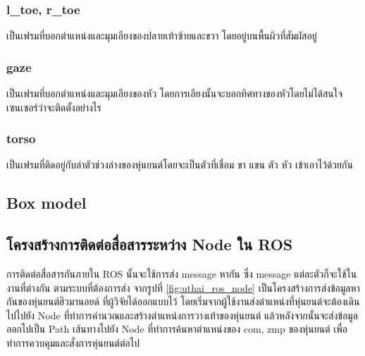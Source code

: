 \subsubsection*{l\_toe, r\_toe}
เป็นเฟรมที่บอกตำแหน่งและมุมเอียงของปลายเท้าซ้ายและขวา โดยอยู่บนพื้นผิวที่สัมผัสอยู่

\subsubsection*{gaze}
เป็นเฟรมที่บอกตำแหน่งและมุมเอียงของหัว โดยการเอียงนั้นจะบอกทิศทางของหัวโดยไม่ได้สนใจเซนเซอร์ว่าจะติดตั้งอย่างไร

\subsubsection*{torso}
เป็นเฟรมที่ติดอยู่กับลำตัวช่วงล่างของหุ่นยนต์โดยจะเป็นตัวที่เชื่อม ขา แขน ตัว หัว เข้าเอาไว้ด้วยกัน


\clearpage
\subsection{Box model}

\clearpage

\clearpage
\subsection{โครงสร้างการติดต่อสื่อสารระหว่าง Node ใน ROS}
การติดต่อสื่อสารกันภายใน ROS นั้นจะใช้การส่ง message หากัน ซึ่ง message แต่ละตัวก็จะใช้ในงานที่ต่างกัน
ตามระบบที่ต้องการส่ง จากรูปที่ \ref{fig:uthai_ros_node} เป็นโครงสร้างการส่งข้อมูลหากันของหุ่นยนต์ฮิวมานอยด์
ที่ผู้วิจัยได้ออกแบบไว้ โดยเริ่มจากผู้ใช้งานส่งตำแหน่งที่หุ่นยนต์จะต้องเดินไปไปยัง Node ที่ทำการคำนวณและสร้างตำแหน่งการวางเท้าของหุ่นยนต์
แล้วหลังจากนั้นจะส่งข้อมูลออกไปเป็น Path เส้นทางไปยัง Node ที่ทำการค้นหาตำแหน่งของ com, zmp ของหุ่นยนต์
เพื่อทำการควบคุมและสั่งการหุ่นยนต์ต่อไป

